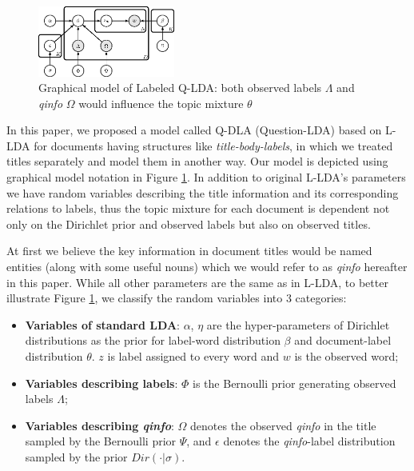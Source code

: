 \begin{figure}

\includegraphics[angle=0,origin=br, width=0.4\textwidth]{fig/qlda.eps}
\caption{Graphical model of Labeled Q-LDA: both observed labels $\Lambda$ and \emph{qinfo} $\Omega$ would influence the topic mixture $\theta$} \label{fig:qlda}
\end{figure}

In this paper, we proposed a model called Q-DLA (Question-LDA) based on L-LDA for documents having structures like \emph{title-body-labels}, in which we treated titles separately and model them in another way. Our model is depicted using graphical model notation in Figure \ref{fig:qlda}. In addition to original L-LDA's parameters we have random variables describing the title information and its corresponding relations to labels, thus the topic mixture for each document is dependent not only on the Dirichlet prior and observed labels but also on observed titles.

At first we believe the key information in document titles would be named entities (along with some useful nouns) which we would refer to as \emph{qinfo} hereafter in this paper. While all other parameters are the same as in L-LDA,  to better illustrate Figure \ref{fig:qlda}, we classify the random variables into 3 categories:

\begin{itemize}
\item \textbf{Variables of standard LDA}: $\alpha$, $\eta$ are the hyper-parameters of Dirichlet distributions as the prior for label-word distribution $\beta$ and document-label distribution $\theta$. $z$ is label assigned to every word and $w$ is the observed word;
\item \textbf{Variables describing labels}: $\Phi$ is the Bernoulli prior generating observed labels $\Lambda$;
\item \textbf{Variables describing \emph{qinfo}}: $\Omega$ denotes the observed \emph{qinfo} in the title sampled by the Bernoulli prior $\Psi$, and $\epsilon$ denotes the \emph{qinfo}-label distribution sampled by the prior $Dir(\cdot|\sigma)$. 
\end{itemize}

